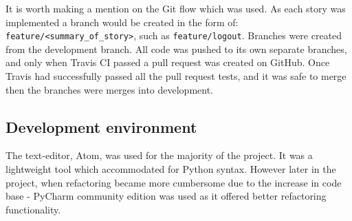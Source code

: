 It is worth making a mention on the Git flow which was used. As each story was implemented a branch would be created in the form of: \texttt{feature/<summary\_of\_story>}, such as \texttt{feature/logout}. Branches were created from the development branch. All code was pushed to its own separate branches, and only when Travis CI passed a pull request was created on GitHub.  Once Travis had successfully passed all the pull request tests, and it was safe to merge then the branches were merges into development.

\subsection{Development environment}
The text-editor, Atom, was used for the majority of the project. It was a lightweight tool which accommodated for Python syntax. However later in the project, when refactoring became more cumbersome due to the increase in code base - PyCharm community edition was used as it offered better refactoring functionality.
